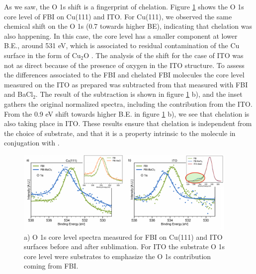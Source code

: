 \documentclass[aps,prl,reprint,longbibliography,superscriptaddress, english]{revtex4-1}
\begin{document}
As we saw, the O 1s shift is a fingerprint of chelation. Figure \ref{XPS_FBI_Cu_ITO} shows the O 1s core level of FBI on Cu(111) and ITO. For Cu(111), we observed the same chemical shift on the O 1s (0.7 towards higher BE), indicating that chelation was also happening. In this case, the core level has a smaller component at lower B.E., around 531 eV, which is associated to residual contamination of the Cu surface in the form of Cu$_2$O \cite{zhu_surface_2013}.
The analysis of the shift for the case of ITO was not as direct because of the presence of oxygen in the ITO structure. To assess the differences associated to the FBI and chelated FBI molecules the core level measured on the ITO as prepared  was subtracted from that measured with FBI and BaCl$_2$. The result of the subtraction is shown in figure \ref{XPS_FBI_Cu_ITO} b), and the inset gathers the original normalized spectra, including the contribution from the ITO. From the 0.9 eV shift towards higher B.E. in figure \ref{XPS_FBI_Cu_ITO} b), we see that chelation is also taking place in ITO. These results ensure that chelation is independent from the choice of substrate, and that it is a property intrinsic to the molecule in conjugation with \Bapp. 


\begin{figure}[ht!]
	\includegraphics[width=0.95\textwidth]{figures/fig5_cu_ito.pdf}
	\caption{\label{XPS_FBI_Cu_ITO} 
    a) O 1s core level spectra measured for FBI on Cu(111) and ITO surfaces before and after \Bapp sublimation. For ITO the substrate O 1s core level were substrates to emphasize the O 1s contribution coming from FBI.}
\end{figure}  
\end{document}
